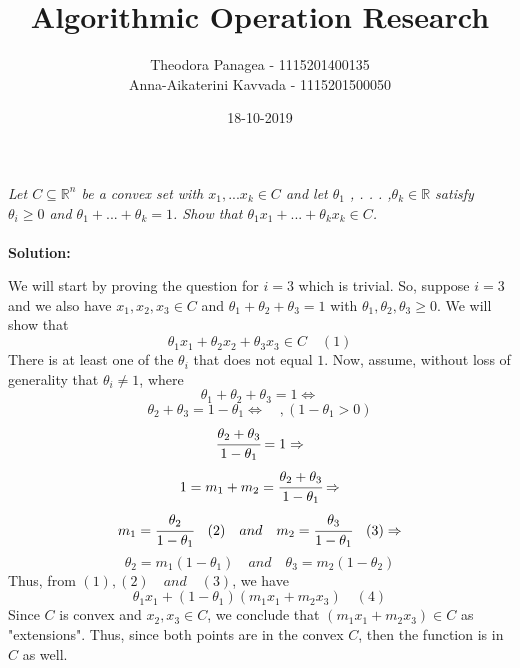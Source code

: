 \documentclass[10pt]{article}
\title{Algorithmic Operation Research}
\date{18-10-2019}
\author{Theodora Panagea - 1115201400135 \\ Anna-Aikaterini Kavvada - 1115201500050}
\newcommand{\R}{\mathbb{R}}
\begin{document}
	\maketitle{}
  	
  	\begin{center}
  	\section{}
  	\end{center}\par
  	\textit{Let  $C \subseteq \R^n$ be a convex set with $x_1 , . . . x_k \in C$ and let $			\theta_1$ , . . . ,$\theta_k \in \R $
  	satisfy $\theta_i \geq 0$ and $\theta_1 + . . . + \theta_k = 1 $. Show that $\theta_1 x_1 + . . . + \theta_k x_k \in C $.}\\ \\
  	\textbf{Solution:}\\ \par
  	We will start by proving the question for $i = 3$ which is trivial. So, suppose $i = 3$  and we also have $x_1, x_2, x_3 \in C$ and $\theta_1 + \theta_2 + \theta_3 = 1$ with $\theta_1, \theta_2, \theta_3 \geq 0$. 
  	  We will show that $$\theta_1 x_1 + \theta_2 x_2 + \theta_3 x_3 \in C\quad (1)$$ 
  	  There is at least one of the $\theta_i$ that does not equal $1$.
  	  Now, assume, without loss of generality that $\theta_i \neq 1$, where $$\theta_1 + \theta_2 + \theta_3 = 1 \iff $$$$\theta_2 + \theta_3 = 1 - \theta_1 \iff\quad,   (1 - \theta_1 > 0)$$ $$\cfrac{\theta_2 + \theta_3}{1-\theta_1} = 1 \Rightarrow$$ $$1 = m_1 + m_2 = \cfrac{\theta_2 + \theta_3}{1-\theta_1} \Rightarrow$$ $$m_1 = \cfrac{\theta_2}{1-\theta_1}\quad(2)\quad and \quad m_2 = \cfrac{\theta_3}{1-\theta_1}\quad(3)\Rightarrow$$ $$\theta_2 = m_1(1 - \theta_1)\quad and \quad \theta_3 = m_2(1 - \theta_2)$$ 
  	  Thus, from $(1), (2)\quad and\quad (3)$, we have 	$$\theta_1 x_1 + (1 - \theta_1)(m_1 x_1 + m_2 x_3)\quad (4)$$
  	  Since $C$ is convex and $x_2, x_3 \in C$, we conclude that $(m_1 x_1 + m_2 x_3) \in C$ as "extensions". Thus, since both points are in the convex $C$, then the function is in $C$ as well.\par 
  	  \newpage
\end{document}
